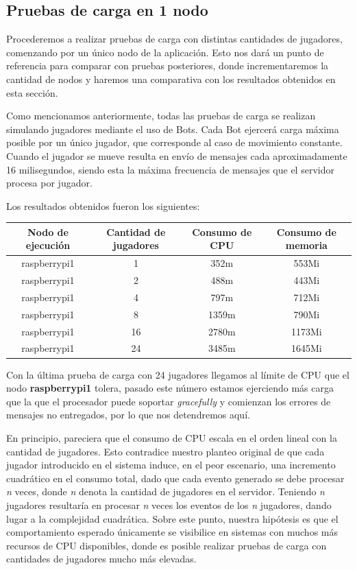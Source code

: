\subsection{Pruebas de carga en 1 nodo}

\noindent Procederemos a realizar pruebas de carga con distintas cantidades de jugadores, comenzando por un único nodo de la aplicación. Esto
nos dará un punto de referencia para comparar con pruebas posteriores, donde incrementaremos la cantidad de nodos y haremos una comparativa con los resultados
obtenidos en esta sección.

Como mencionamos anteriormente, todas las pruebas de carga se realizan simulando jugadores mediante el uso de Bots. Cada Bot ejercerá carga máxima posible por un único jugador, que corresponde
al caso de movimiento constante. Cuando el jugador se mueve resulta en envío de mensajes cada aproximadamente 16 milisegundos, siendo esta la máxima frecuencia de mensajes que el servidor
procesa por jugador.

Los resultados obtenidos fueron los siguientes:

\begin{center}
\begin{tabular}{|c|c|c|c|}
    \hline
    \textbf{Nodo de ejecución} & \textbf{Cantidad de jugadores} & \textbf{Consumo de CPU} & \textbf{Consumo de memoria} \\
    \hline
    raspberrypi1 & 1 & 352m & 553Mi \\
    \hline
    raspberrypi1 & 2 & 488m & 443Mi \\
    \hline
    raspberrypi1 & 4 & 797m & 712Mi \\
    \hline
    raspberrypi1 & 8 & 1359m & 790Mi \\
    \hline
    raspberrypi1 & 16 & 2780m & 1173Mi \\
    \hline
    raspberrypi1 & 24 & 3485m & 1645Mi \\
    \hline
\end{tabular}
\end{center}

Con la última prueba de carga con 24 jugadores llegamos al límite de CPU que el nodo \textbf{raspberrypi1} tolera, pasado este número estamos ejerciendo más carga que la que el procesador
puede soportar \textit{gracefully} y comienzan los errores de mensajes no entregados, por lo que nos detendremos aquí. 

En principio, pareciera que el consumo de CPU escala en el orden lineal con la cantidad de jugadores. Esto contradice nuestro planteo original
de que cada jugador introducido en el sistema induce, en el peor escenario, una incremento cuadrático en el consumo total, dado que cada evento generado se debe procesar \textit{n} veces, donde \textit{n} denota la cantidad de jugadores en el servidor.
Teniendo \textit{n} jugadores resultaría en procesar \textit{n} veces los eventos de los \textit{n} jugadores, dando lugar a la complejidad cuadrática.
Sobre este punto, nuestra hipótesis es que el comportamiento esperado únicamente se visibilice en sistemas con muchos más recursos de CPU disponibles, donde es posible realizar pruebas de carga
con cantidades de jugadores mucho más elevadas.

